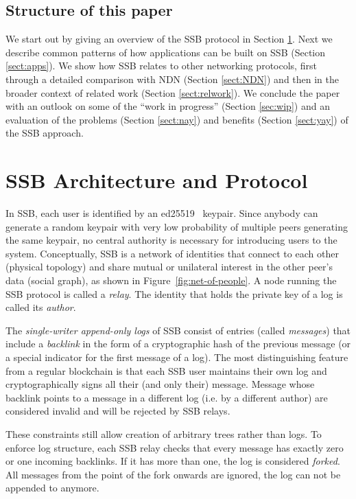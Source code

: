 \documentclass[9pt,sigconf]{acmart}
\begin{document}
\subsection*{Structure of this paper}

We start out by giving an overview of the SSB protocol in Section \ref{sect:architecture}. Next we describe common patterns of how applications can be built on SSB (Section \ref{sect:apps}). We show how SSB relates to other networking protocols, first through a detailed comparison with NDN (Section \ref{sect:NDN}) and then in the broader context of related work (Section \ref{sect:relwork}). We conclude the paper with an outlook on some of the ``work in progress'' (Section \ref{sec:wip}) and an evaluation of the problems (Section \ref{sect:nay}) and benefits (Section \ref{sect:yay}) of the SSB approach.


\section{SSB Architecture and Protocol}
\label{sect:architecture}

In SSB, each user is identified by an ed25519~\cite{bernstein2012high} keypair. Since anybody can generate a random keypair with very low probability of multiple peers generating the same keypair, no central authority is necessary for introducing users to the system. Conceptually, SSB is a network of identities that connect to each other (physical topology) and share mutual or unilateral interest in the other peer's data (social graph), as shown in Figure~\ref{fig:net-of-people}. A node running the SSB protocol is called a \textit{relay}. The identity that holds the private key of a log is called its \textit{author}.

The {\em single-writer append-only logs} of SSB consist of entries (called \textit{messages}) that include a {\em backlink} in the form of a cryptographic hash of the previous message (or a special indicator for the first message of a log). The most distinguishing feature from a regular blockchain is that each SSB user maintains their own log and cryptographically signs all their (and only their) message. Message whose backlink points to a message in a different log (i.e. by a different author) are considered invalid and will be rejected by SSB relays.

These constraints still allow creation of arbitrary trees rather than logs. To enforce log structure, each SSB relay checks that every message has exactly zero or one incoming backlinks. If it has more than one, the log is considered {\em forked}. All messages from the point of the fork onwards are ignored, the log can not be appended to anymore.
\end{document}
